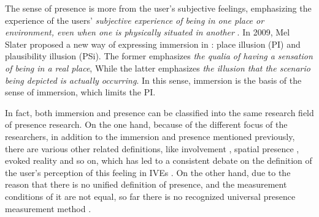 \documentclass[sigconf]{acmart}
\begin{document}

The sense of presence is more from the user's subjective feelings, emphasizing the experience of the users' \emph{subjective experience of being in one place or environment, even when one is physically situated in another} \cite{witmer1998measuring}. In 2009, Mel Slater proposed a new way of expressing immersion in \cite{slater2009place}: place illusion (PI) and plausibility illusion (PSi). The former emphasizes \emph{the qualia of having a sensation of being in a real place}, While the latter emphasizes \emph{the illusion that the scenario being depicted is actually occurring}. In this sense, immersion is the basis of the sense of immersion, which limits the PI.


In fact, both immersion and presence can be classified into the same research field of presence research. On the one hand, because of the different focus of the researchers, in addition to the immersion and presence mentioned previously, there are various other related definitions, like involvement \cite{witmer1998measuring}, spatial presence \cite{Hartmann2015Spatial}, evoked reality \cite{Pillai2013Achieving} and so on, which has led to a consistent debate on the definition of the user's perception of this feeling in IVEs \cite{ijsselsteijn2000presence,birkenbusch2013concepts,skarbez2016plausibility,darken1999quantitative}. On the other hand, due to the reason that there is no unified definition of presence, and the measurement conditions of it are not equal, so far there is no recognized universal presence measurement method \cite{birkenbusch2013concepts}.
\end{document}
